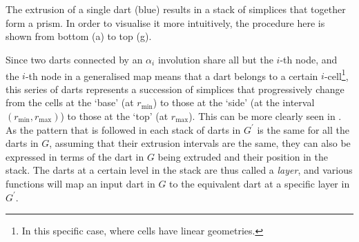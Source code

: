 {\setcounter{subfigure}{1}\\
\vspace{-3mm}
\setcounter{subfigure}{0}\\
\caption[The stack of simplices in an extruded dart]{The extrusion of a single dart (blue) results in a stack of simplices that together form a prism.
In order to visualise it more intuitively, the procedure here is shown from bottom (a) to top (g).
}
\label{fig:stack}
}

Since two darts connected by an $\alpha_i$ involution share all but the $i$-th node, and the $i$-th node in a generalised map means that a dart belongs to a certain $i$-cell\footnote{In this specific case, where cells have linear geometries.}, this series of darts represents a succession of simplices that progressively change from the cells at the `base' (at $r_{\min}$) to those at the `side' (at the interval $(r_{\min}, r_{\max})$) to those at the `top' (at $r_{\max}$).
This can be more clearly seen in .
As the pattern that is followed in each stack of darts in $G^\prime$ is the same for all the darts in $G$, assuming that their extrusion intervals are the same, they can also be expressed in terms of the dart in $G$ being extruded and their position in the stack.
The darts at a certain level in the stack are thus called a \emph{layer}, and various functions will map an input dart in $G$ to the equivalent dart at a specific layer in $G^\prime$.

